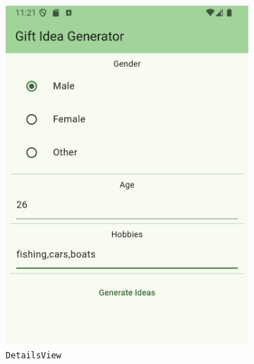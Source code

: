 \begin{figure}

	\begin{subfigure}{0.5\textwidth}
		\includegraphics[width=0.9\linewidth]{figures/screenshots/old_details_view_cropped.png}
		\caption{\texttt{DetailsView}}
	\end{subfigure}
	\begin{subfigure}{0.5\textwidth}

\end{subfigure}
\end{figure}
